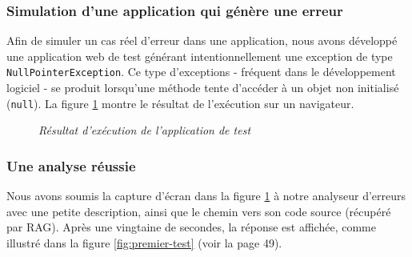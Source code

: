 \documentclass[12pt,a4paper]{report}
\begin{document}
	
	\subsubsection{Simulation d'une application qui génère une erreur}
	
	Afin de simuler un cas réel d'erreur dans une application, nous avons développé une application web de test générant intentionnellement une exception de type \verb|NullPointerException|. Ce type d'exceptions - fréquent dans le développement logiciel - se produit lorsqu'une méthode tente d'accéder à un objet non initialisé (\verb|null|). La figure \ref{fig:simulation-erreur} montre le résultat de l'exécution sur un navigateur.
	
	\begin{figure}[H]
		\centering
		\caption{\textit{Résultat d'exécution de l'application de test}}
		\label{fig:simulation-erreur}
	\end{figure}
	
	\subsubsection{Une analyse réussie}
	
	Nous avons soumis la capture d'écran dans la figure \ref{fig:simulation-erreur} à notre analyseur d'erreurs avec une petite description, ainsi que le chemin vers son code source (récupéré par RAG). Après une vingtaine de secondes, la réponse est affichée, comme illustré dans la figure \ref{fig:premier-test} (voir la page 49).
	
\end{document}

